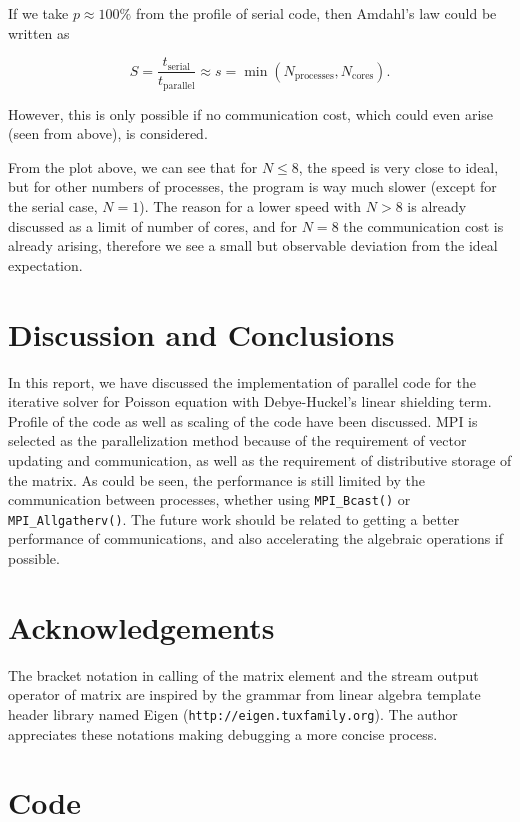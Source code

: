 \documentclass{article}
\begin{document}
\begin{spacing}{1.1}
If we take $p \approx 100\%$ from the profile of serial code, then Amdahl's law could be written as

\[S=\frac{t_\mathrm{serial}}{t_\mathrm{parallel}} \approx s = \min{(N_\mathrm{processes}, N_\mathrm{cores})}.\]

However, this is only possible if no communication cost, which could even arise (seen from above), is considered. 

From the plot above, we can see that for $N \leq 8$, the speed is very close to ideal, but for other numbers of processes, the program is way much slower (except for the serial case, $N=1$). The reason for a lower speed with $N > 8$ is already discussed as a limit of number of cores, and for $N = 8$ the communication cost is already arising, therefore we see a small but observable deviation from the ideal expectation.

\section{Discussion and Conclusions}

In this report, we have discussed the implementation of parallel code for the iterative solver for Poisson equation with Debye-Huckel's linear shielding term. Profile of the code as well as scaling of the code have been discussed. MPI is selected as the parallelization method because of the requirement of vector updating and communication, as well as the requirement of distributive storage of the matrix. As could be seen, the performance is still limited by the communication between processes, whether using \texttt{MPI\_Bcast()} or \texttt{MPI\_Allgatherv()}. The future work should be related to getting a better performance of communications, and also accelerating the algebraic operations if possible.

\newpage
\begin{appendices}

\section{Acknowledgements}

The bracket notation in calling of the matrix element and the stream output operator of matrix are inspired by the grammar from linear algebra template header library named Eigen (\texttt{http://eigen.tuxfamily.org}). The author appreciates these notations making debugging a more concise process.

\section{Code}


\end{appendices}
\end{spacing}
\end{document}
